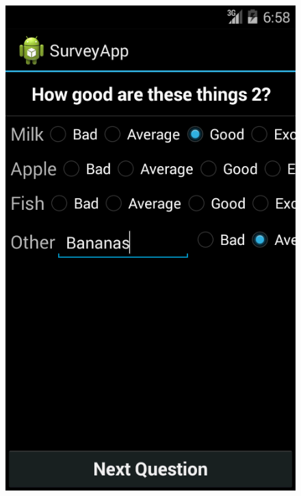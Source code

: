 \documentclass[runningheads,a4paper]{llncs}
\begin{document}
\begin{figure}[htb]
{	\includegraphics[scale=0.22]{images/android/android_5}}
	\subfigure[Question 6]{
}
\end{figure}
\end{document}
